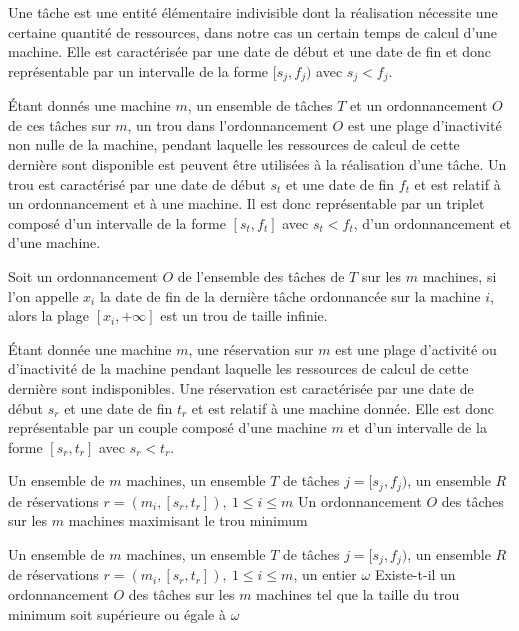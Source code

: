 \documentclass[a4paper,11pt]{thesis}
\begin{document}



\begin{ndf}[Tâche]
    Une tâche est une entité élémentaire indivisible dont la réalisation nécessite une certaine
    quantité de ressources, dans notre cas un certain temps de calcul d'une machine. Elle est
    caractérisée par une date de début et une date de fin et donc représentable par un intervalle de
    la forme $[s_j, f_j)$ avec $s_j < f_j$.
\end{ndf}

\begin{ndf}[Trou]
    Étant donnés une machine $m$, un ensemble de tâches $T$ et un ordonnancement $O$ de ces tâches
    sur $m$, un trou dans l'ordonnancement $O$ est une plage d'inactivité non nulle de la machine,
    pendant laquelle les ressources de calcul de cette dernière sont disponible est peuvent être
    utilisées à la réalisation d'une tâche. Un trou est caractérisé par une date de début $s_t$ et
    une date de fin $f_t$ et est relatif à un ordonnancement et à une machine. Il est donc
    représentable par un triplet composé d'un intervalle de la forme $[s_t, f_t]$ avec $s_t <
    f_t$, d'un ordonnancement et d'une machine.
\end{ndf}

\begin{nrmq}
    Soit un ordonnancement $O$ de l'ensemble des tâches de $T$ sur les $m$ machines, si l'on appelle
    $x_i$ la date de fin de la dernière tâche ordonnancée sur la machine $i$, alors la plage
    $[x_i,+\infty]$ est un trou de taille infinie.
\end{nrmq}

\begin{ndf}[Réservation]
    Étant donnée une machine $m$, une réservation sur $m$ est une plage d'activité ou
    d'inactivité de la machine pendant laquelle les ressources de calcul de cette dernière sont
    indisponibles. Une réservation est caractérisée par une date de début $s_r$ et une date de fin
    $t_r$ et est relatif à une machine donnée. Elle est donc représentable par un couple composé
    d'une machine $m$ et d'un intervalle de la forme $[s_r, t_r]$ avec $s_r < t_r$.
\end{ndf}

\dfopt{\fisched}
    {Un ensemble de $m$ machines, un ensemble $T$ de tâches $j = [s_j, f_j)$, un ensemble $R$ de
        réservations $r = (m_i, [s_r, t_r]),\ 1 \leq i \leq m$}
    {Un ordonnancement $O$ des tâches sur les $m$ machines maximisant le trou minimum}

\dfpb{\fischedpi}
    {Un ensemble de $m$ machines, un ensemble $T$ de tâches $j = [s_j, f_j)$, un ensemble $R$ de
        réservations $r = (m_i, [s_r, t_r]),\ 1 \leq i \leq m$, un entier $\omega$}
    {Existe-t-il un ordonnancement $O$ des tâches sur les $m$ machines tel que la taille du trou
        minimum soit supérieure ou égale à $\omega$}


\end{document}

